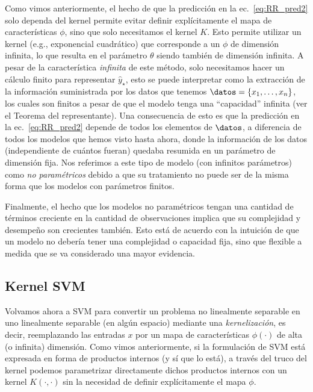 \begin{remark} Como vimos anteriormente, el hecho de que la predicción en la ec.~\eqref{eq:RR_pred2} solo dependa del kernel permite evitar definir explícitamente el mapa de características $\phi$, sino que solo necesitamos el kernel $K$. Esto permite utilizar un kernel (e.g., exponencial cuadrático) que corresponde a un $\phi$ de dimensión infinita, lo que resulta en el parámetro $\theta$ siendo también de dimensión infinita. A pesar de la característica \emph{infinita} de este método, solo necesitamos hacer un cálculo finito para representar $\hat{y}_\star$, esto se puede interpretar como la extracción de la información suministrada por los datos que tenemos $\datos = \{x_1,\ldots,x_n\}$, los cuales son finitos a pesar de que el modelo tenga una ``capacidad'' infinita (ver el Teorema del representante). Una consecuencia de esto es que la predicción en la ec.~\eqref{eq:RR_pred2} depende de todos los elementos de $\datos$, a diferencia de todos los modelos que hemos visto hasta ahora, donde la información de los datos (independiente de cuántos fueran) quedaba resumida en un parámetro de dimensión fija. Nos referimos a este tipo de modelo (con infinitos parámetros) como \emph{no paramétricos} debido a que su tratamiento no puede ser de la misma forma que los modelos con parámetros finitos.  
\end{remark}

\begin{remark} 
Finalmente, el hecho que los modelos no paramétricos tengan una cantidad de términos creciente en la cantidad de observaciones implica que su complejidad y desempeño son crecientes también. Esto está de acuerdo con la intuición de que  un modelo no debería tener una complejidad o capacidad fija, sino que flexible a medida que se va considerado una mayor evidencia.
\end{remark}

\noindent{}



\subsection{Kernel SVM}

Volvamos ahora a SVM para convertir un problema no linealmente separable en uno linealmente separable (en algún espacio) mediante una \emph{kernelización}, es decir, reemplazando las entradas $x$ por un mapa de características $\phi(\cdot)$ de alta (o infinita) dimensión. Como vimos anteriormente, si la formulación de SVM está expresada en forma de productos internos (y sí que lo está), a través del truco del kernel podemos parametrizar directamente dichos productos internos con un kernel $K(\cdot,\cdot)$ sin la necesidad de definir explícitamente el mapa $\phi$. 

